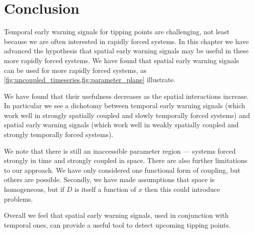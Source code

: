 \section{Conclusion}

Temporal early warning signals for tipping points are challenging, not least because we are often interested in rapidly forced systems. In this chapter
we have advanced the hypothesis that spatial early warning signals may be useful in these more rapidly forced systems.
We have found that spatial early warning signals can be used for more rapidly forced systems, as \cref{fig:uncoupled_timeseries,fig:parameter_plane}
illustrate.

We have found that their usefulness decreases as the spatial interactions increase.
In particular we see a dichotomy between temporal early warning signals (which work well in strongly spatially coupled and slowly temporally forced systems)
and spatial early warning signals (which work well in weakly spatially coupled and strongly temporally forced systems).

We note that there is still an inaccessible parameter region --- systems forced strongly in time and strongly coupled in space. There are also further limitations
to our approach.  We have only considered one functional form of coupling, but others are possible. Secondly, we have made
assumptions that space is homogeneous, but if $D$ is itself a function of $x$ then this could introduce problems.

Overall we feel that spatial early warning signals, used in conjunction with temporal ones, can provide a useful tool to detect upcoming tipping points.